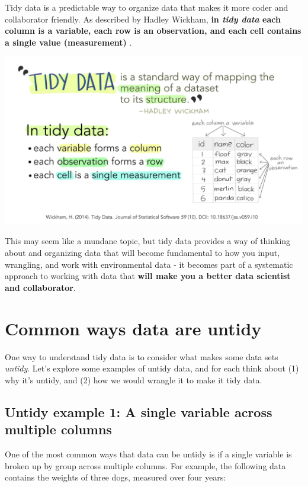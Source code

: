 \documentclass[
]{book}
\begin{document}
Tidy data is a predictable way to organize data that makes it more coder and collaborator friendly. As described by Hadley Wickham, \textbf{in \emph{tidy data} each column is a variable, each row is an observation, and each cell contains a single value (measurement)} \citep{wickham_tidy_2014}.

\includegraphics[width=6.25in,height=\textheight]{images/tidydata_1.jpg}

This may seem like a mundane topic, but tidy data provides a way of thinking about and organizing data that will become fundamental to how you input, wrangling, and work with environmental data - it becomes part of a systematic approach to working with data that \textbf{will make you a better data scientist and collaborator}.

\hypertarget{common-ways-data-are-untidy}{%
\section{Common ways data are untidy}\label{common-ways-data-are-untidy}}

One way to understand tidy data is to consider what makes some data sets \emph{untidy}. Let's explore some examples of untidy data, and for each think about (1) why it's untidy, and (2) how we would wrangle it to make it tidy data.

\hypertarget{untidy-example-1-a-single-variable-across-multiple-columns}{%
\subsection{Untidy example 1: A single variable across multiple columns}\label{untidy-example-1-a-single-variable-across-multiple-columns}}

One of the most common ways that data can be untidy is if a single variable is broken up by group across multiple columns. For example, the following data contains the weights of three dogs, measured over four years:
\end{document}
